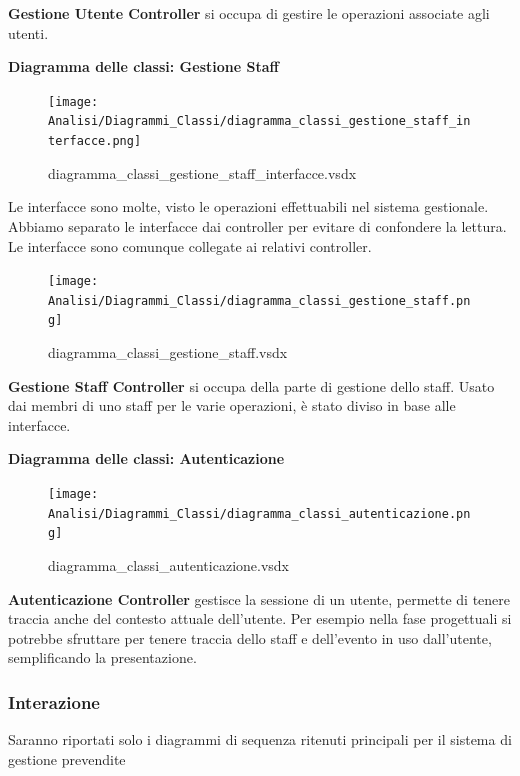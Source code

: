 \documentclass[a4paper]{article}
\begin{document}
\textbf{Gestione Utente Controller} si occupa di gestire le operazioni associate agli utenti.

\newpage

\textbf{Diagramma delle classi: Gestione Staff}

\begin{figure}[H]
    \texttt{[image: Analisi/Diagrammi\_Classi/diagramma\_classi\_gestione\_staff\_interfacce.png]}
    \centering
    \caption{diagramma\_classi\_gestione\_staff\_interfacce.vsdx}
\end{figure}

Le interfacce sono molte, visto le operazioni effettuabili nel sistema gestionale. Abbiamo separato le interfacce dai controller per evitare di confondere la lettura. Le interfacce sono comunque collegate ai relativi controller.

\begin{figure}[H]
    \texttt{[image: Analisi/Diagrammi\_Classi/diagramma\_classi\_gestione\_staff.png]}
    \centering
    \caption{diagramma\_classi\_gestione\_staff.vsdx}
\end{figure}

\textbf{Gestione Staff Controller} si occupa della parte di gestione dello staff. Usato dai membri di uno staff per le varie operazioni, è stato diviso in base alle interfacce. 


\newpage

\textbf{Diagramma delle classi: Autenticazione}

\begin{figure}[H]
    \texttt{[image: Analisi/Diagrammi\_Classi/diagramma\_classi\_autenticazione.png]}
    \centering
    \caption{diagramma\_classi\_autenticazione.vsdx}
\end{figure}

\textbf{Autenticazione Controller} gestisce la sessione di un utente, permette di tenere traccia anche del contesto attuale dell'utente. Per esempio nella fase progettuali si potrebbe sfruttare per tenere traccia dello staff e dell'evento in uso dall'utente, semplificando la presentazione.

\newpage

\subsubsection{Interazione}

Saranno riportati solo i diagrammi di sequenza ritenuti principali per il sistema di gestione prevendite
\end{document}
